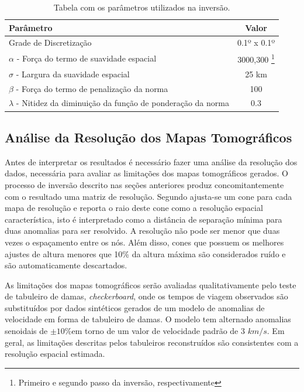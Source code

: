 \begin{savenotes}
\begin{table}[!ht]
\begin{center}
\small
\caption{Tabela com os parâmetros utilizados na inversão.}
\begin{tabular}{ l c }
\hline
{\textbf{Parâmetro}} & {\textbf{Valor}}\\
\hline
Grade de Discretização & 0.1º x 0.1º\\
$\alpha$ - Força do termo de suavidade espacial & 3000,300 \footnote{Primeiro e segundo passo da inversão, respectivamente}
\\
$\sigma$ - Largura da suavidade espacial & 25 km\\
$\beta$ - Força do termo de penalização da norma & 100\\
$\lambda$ - Nitidez da diminuição da função de ponderação da norma & 0.3\\
\hline
\end{tabular}
\label{tabelaPARAMETROS}
\end{center}
\end{table}
\end{savenotes}

\subsection{Análise da Resolução dos Mapas Tomográficos}

Antes de interpretar os resultados é necessário fazer uma análise da resolução dos dados, necessária para avaliar as limitações dos mapas tomográficos gerados. O processo de inversão descrito nas seções anteriores produz concomitantemente com o resultado uma matriz de resolução. Segundo \cite{barmin_fast_2001} ajusta-se um cone para cada mapa de resolução e reporta o raio deste cone como a resolução espacial característica, isto é interpretado como a distância de separação mínima para duas anomalias para ser resolvido. A resolução não pode ser menor que duas vezes o espaçamento entre os nós. Além disso, cones que possuem os melhores ajustes de altura menores que 10\% da altura máxima são considerados ruído e são automaticamente descartados.  

As limitações dos mapas tomográficos serão avaliadas qualitativamente pelo teste de tabuleiro de damas, \textit{checkerboard}, onde os tempos de viagem observados são substituídos por dados sintéticos gerados de um modelo de anomalias  de velocidade em forma de tabuleiro de damas. O modelo tem alternado anomalias senoidais de $\pm 10\% $em torno de um valor de velocidade padrão de 3 $km/s$. Em geral, as limitações descritas pelos tabuleiros reconstruídos são consistentes com a resolução espacial estimada.

